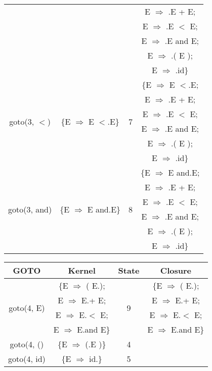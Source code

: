 \begin{table}[H]
\begin{minipage}[t]{.4\linewidth}
\begin{tabular}{|c|c|c|c|}
      & & & E $\Rightarrow$ .E + E; \\
      & & & E $\Rightarrow$ .E $<$ E; \\
      & & & E $\Rightarrow$ .E and E; \\
      & & & E $\Rightarrow$ .( E ); \\
      & & & E $\Rightarrow$ .id\}\\
      \hline
      \multirow{6}{*}{goto(3, $<$)} & \multirow{6}{*}{\{E $\Rightarrow$ E $<$.E\}}	& \multirow{6}{*}{7}	& \{E $\Rightarrow$ E $<$.E; \\
      & & & E $\Rightarrow$ .E + E; \\
      & & & E $\Rightarrow$ .E $<$ E; \\
      & & & E $\Rightarrow$ .E and E; \\
      & & & E $\Rightarrow$ .( E ); \\
      & & & E $\Rightarrow$ .id\}\\
      \hline
      \multirow{6}{*}{goto(3, and)} & \multirow{6}{*}{\{E $\Rightarrow$ E and.E\}}	& \multirow{6}{*}{8}	& \{E $\Rightarrow$ E and.E; \\
      & & & E $\Rightarrow$ .E + E; \\
      & & & E $\Rightarrow$ .E $<$ E; \\
      & & & E $\Rightarrow$ .E and E; \\
      & & & E $\Rightarrow$ .( E ); \\
      & & & E $\Rightarrow$ .id\}\\
      \hline
    \end{tabular}
  \end{minipage}
  \hspace{3cm}
  \begin{minipage}[t]{.4\linewidth}
    \begin{tabular}{|c|c|c|c|}
      \hline
      GOTO & Kernel & State & Closure\\
      \hline
      \multirow{4}{*}{goto(4, E)} & \{E $\Rightarrow$ ( E.); & \multirow{4}{*}{9}	& \{E $\Rightarrow$ ( E.); \\
      & E $\Rightarrow$ E.+ E; & & E $\Rightarrow$ E.+ E; \\
      & E $\Rightarrow$ E.$<$ E; & & E $\Rightarrow$ E.$<$ E; \\
      & E $\Rightarrow$ E.and E\} & & E $\Rightarrow$ E.and E\}\\
      \hline
      goto(4, ()	& \{E $\Rightarrow$ (.E )\}	& 4	& \\
      \hline
      goto(4, id)	& \{E $\Rightarrow$ id.\} & 5 & \\

\end{tabular}
\end{minipage}
\end{table}

